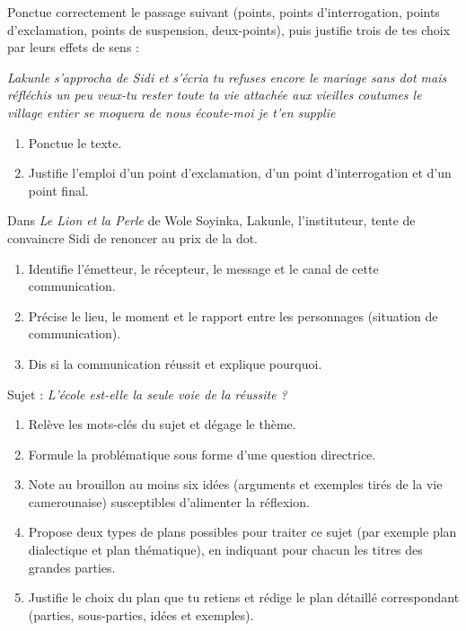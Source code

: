 \documentclass[11pt]{article}
\newcounter{popsec}
\newcounter{popsub}
\newcommand{\courssub}[1]{%
  \stepcounter{popsub}%
  \par\vspace{9pt}\noindent{\popxbold\fontsize{11.5}{13}\selectfont\color{popink}{\color{poporange}\thepopsec.\thepopsub}\hspace{6pt}#1}\par\nopagebreak\vspace{4pt}
}
\begin{document}
\begin{exercice}
Ponctue correctement le passage suivant (points, points d'interrogation, points d'exclamation, points de suspension, deux-points), puis justifie trois de tes choix par leurs effets de sens :

\emph{Lakunle s'approcha de Sidi et s'écria tu refuses encore le mariage sans dot mais réfléchis un peu veux-tu rester toute ta vie attachée aux vieilles coutumes le village entier se moquera de nous écoute-moi je t'en supplie}

\begin{enumerate}
\item Ponctue le texte.
\item Justifie l'emploi d'un point d'exclamation, d'un point d'interrogation et d'un point final.
\end{enumerate}
\end{exercice}

\begin{exercice}
Dans \emph{Le Lion et la Perle} de Wole Soyinka, Lakunle, l'instituteur, tente de convaincre Sidi de renoncer au prix de la dot.
\begin{enumerate}
\item Identifie l'émetteur, le récepteur, le message et le canal de cette communication.
\item Précise le lieu, le moment et le rapport entre les personnages (situation de communication).
\item Dis si la communication réussit et explique pourquoi.
\end{enumerate}
\end{exercice}

\courssub{Je me prépare au Bac}

\begin{exercice}
Sujet : \emph{L'école est-elle la seule voie de la réussite ?}
\begin{enumerate}
\item Relève les mots-clés du sujet et dégage le thème.
\item Formule la problématique sous forme d'une question directrice.
\item Note au brouillon au moins six idées (arguments et exemples tirés de la vie camerounaise) susceptibles d'alimenter la réflexion.
\item Propose deux types de plans possibles pour traiter ce sujet (par exemple plan dialectique et plan thématique), en indiquant pour chacun les titres des grandes parties.
\item Justifie le choix du plan que tu retiens et rédige le plan détaillé correspondant (parties, sous-parties, idées et exemples).
\end{enumerate}
\end{exercice}
\end{document}
